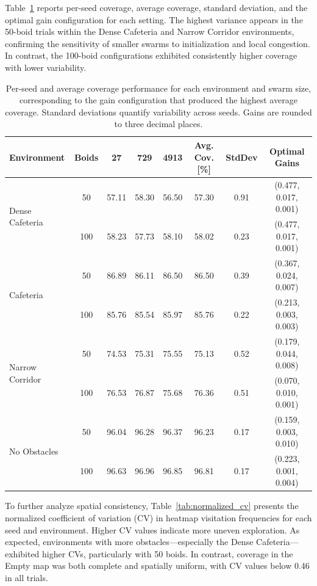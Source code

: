 \documentclass[12pt]{article}
\begin{document}
Table~\ref{tab:coverage_by_seed_and_optimal_gain} reports per-seed coverage, average coverage, standard deviation, and the optimal gain configuration for each setting. The highest variance appears in the 50-boid trials within the Dense Cafeteria and Narrow Corridor environments, confirming the sensitivity of smaller swarms to initialization and local congestion. In contrast, the 100-boid configurations exhibited consistently higher coverage with lower variability.

\begin{table}[H]
    \footnotesize
    \centering
    \begin{tabular}{|l|c|c|c|c|c|c|c|}
    \hline
    \textbf{Environment} & \textbf{Boids} & \textbf{27} & \textbf{729} & \textbf{4913} & \textbf{Avg. Cov. [\%]} & \textbf{StdDev} & \textbf{Optimal Gains} \\
    \hline
    \multirow{2}{*}{Dense Cafeteria} 
        & 50  & 57.11 & 58.30 & 56.50 & 57.30 & 0.91 & (0.477, 0.017, 0.001) \\
        & 100 & 58.23 & 57.73 & 58.10 & 58.02 & 0.23 & (0.477, 0.017, 0.001) \\
    \hline
    \multirow{2}{*}{Cafeteria} 
        & 50  & 86.89 & 86.11 & 86.50 & 86.50 & 0.39 & (0.367, 0.024, 0.007) \\
        & 100 & 85.76 & 85.54 & 85.97 & 85.76 & 0.22 & (0.213, 0.003, 0.003) \\
    \hline
    \multirow{2}{*}{Narrow Corridor} 
        & 50  & 74.53 & 75.31 & 75.55 & 75.13 & 0.52 & (0.179, 0.044, 0.008) \\
        & 100 & 76.53 & 76.87 & 75.68 & 76.36 & 0.51 & (0.070, 0.010, 0.001) \\
    \hline
    \multirow{2}{*}{No Obstacles} 
        & 50  & 96.04 & 96.28 & 96.37 & 96.23 & 0.17 & (0.159, 0.003, 0.010) \\
        & 100 & 96.63 & 96.96 & 96.85 & 96.81 & 0.17 & (0.223, 0.001, 0.004) \\
    \hline
    \end{tabular}
    \caption{Per-seed and average coverage performance for each environment and swarm size, corresponding to the gain configuration that produced the highest average coverage. Standard deviations quantify variability across seeds. Gains are rounded to three decimal places.}
    \label{tab:coverage_by_seed_and_optimal_gain}
\end{table}

To further analyze spatial consistency, Table~\ref{tab:normalized_cv} presents the normalized coefficient of variation (CV) in heatmap visitation frequencies for each seed and environment. Higher CV values indicate more uneven exploration. As expected, environments with more obstacles—especially the Dense Cafeteria—exhibited higher CVs, particularly with 50 boids. In contrast, coverage in the Empty map was both complete and spatially uniform, with CV values below 0.46 in all trials.
\end{document}
